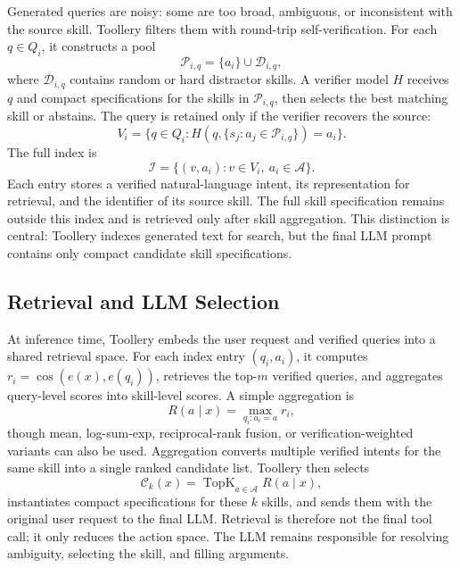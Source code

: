 \documentclass[11pt]{article}
\begin{document}
Generated queries are noisy: some are too broad, ambiguous, or inconsistent with the source skill. Toollery filters them with round-trip self-verification. For each $q\in Q_i$, it constructs a pool
\begin{equation}
\mathcal{P}_{i,q}=\{a_i\}\cup\mathcal{D}_{i,q},
\end{equation}
where $\mathcal{D}_{i,q}$ contains random or hard distractor skills. A verifier model $H$ receives $q$ and compact specifications for the skills in $\mathcal{P}_{i,q}$, then selects the best matching skill or abstains. The query is retained only if the verifier recovers the source:
\begin{equation}
V_i=\{q\in Q_i:H(q,\{s_j:a_j\in\mathcal{P}_{i,q}\})=a_i\}.
\end{equation}
The full index is
\begin{equation}
\mathcal{I}=\{(v,a_i):v\in V_i,\ a_i\in\mathcal{A}\}.
\end{equation}
Each entry stores a verified natural-language intent, its representation for retrieval, and the identifier of its source skill. The full skill specification remains outside this index and is retrieved only after skill aggregation. This distinction is central: Toollery indexes generated text for search, but the final LLM prompt contains only compact candidate skill specifications.

\subsection{Retrieval and LLM Selection}
\label{subsec:selection}

At inference time, Toollery embeds the user request and verified queries into a shared retrieval space. For each index entry $(q_i,a_i)$, it computes $r_i=\cos(e(x),e(q_i))$, retrieves the top-$m$ verified queries, and aggregates query-level scores into skill-level scores. A simple aggregation is
\begin{equation}
R(a\mid x)=\max_{q_i:a_i=a} r_i,
\end{equation}
though mean, log-sum-exp, reciprocal-rank fusion, or verification-weighted variants can also be used. Aggregation converts multiple verified intents for the same skill into a single ranked candidate list. Toollery then selects
\begin{equation}
\mathcal{C}_k(x)=\operatorname{TopK}_{a\in\mathcal{A}} R(a\mid x),
\end{equation}
instantiates compact specifications for these $k$ skills, and sends them with the original user request to the final LLM. Retrieval is therefore not the final tool call; it only reduces the action space. The LLM remains responsible for resolving ambiguity, selecting the skill, and filling arguments.
\end{document}
